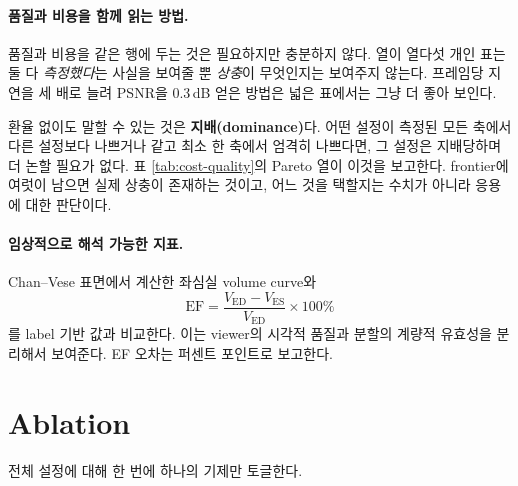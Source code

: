 \paragraph{품질과 비용을 함께 읽는 방법.}
\label{sec:cost-quality}
품질과 비용을 같은 행에 두는 것은 필요하지만 충분하지 않다. 열이 열다섯 개인 표는 둘 다
\emph{측정했다}는 사실을 보여줄 뿐 \emph{상충}이 무엇인지는 보여주지 않는다. 프레임당
지연을 세 배로 늘려 PSNR을 0.3\,dB 얻은 방법은 넓은 표에서는 그냥 더 좋아 보인다.

환율 없이도 말할 수 있는 것은 \textbf{지배(dominance)}다. 어떤 설정이 측정된 모든 축에서
다른 설정보다 나쁘거나 같고 최소 한 축에서 엄격히 나쁘다면, 그 설정은 지배당하며 더 논할
필요가 없다. 표 \ref{tab:cost-quality}의 Pareto 열이 이것을 보고한다. frontier에 여럿이
남으면 실제 상충이 존재하는 것이고, 어느 것을 택할지는 수치가 아니라 응용에 대한 판단이다.





\paragraph{임상적으로 해석 가능한 지표.}
Chan--Vese 표면에서 계산한 좌심실 volume curve와
\begin{equation}
  \mathrm{EF} = \frac{V_{\mathrm{ED}}-V_{\mathrm{ES}}}{V_{\mathrm{ED}}}\times100\%
  \label{eq:ef}
\end{equation}
를 label 기반 값과 비교한다. 이는 viewer의 시각적 품질과 분할의 계량적 유효성을
분리해서 보여준다. EF 오차는 퍼센트 포인트로 보고한다.

\section{Ablation}
\label{sec:ablation-design}

전체 설정에 대해 한 번에 하나의 기제만 토글한다.

